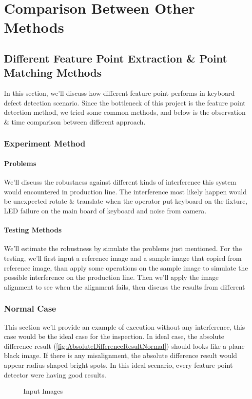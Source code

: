 \chapter{Comparison Between Other Methods}
\label{c:comparision}

\section{Different Feature Point Extraction \& Point Matching Methods}
	In this section, we'll discuss how different feature point performs in keyboard defect detection scenario.
	Since the bottleneck of this project is the feature point detection method, we tried some common methods, and below is the observation \& time comparison between different approach.
	\subsection{Experiment Method}
		\subsubsection{Problems}
			We'll discuss the robustness against different kinds of interference this system would encountered in production line.
			The interference most likely happen would be 
			unexpected rotate \& translate when the operator put keyboard on the fixture, 
			LED failure on the main board of keyboard and noise from camera.
		\subsubsection{Testing Methods}
			We'll estimate the robustness by simulate the problems just mentioned. 
			For the testing, we'll first input a reference image and a sample image that copied from reference image, 
			than apply some operations on the sample image to simulate the possible interference on the production line.
			Then we'll apply the image alignment to see when the alignment fails, then discuss the results from different \\


	\subsection{Normal Case}
		This section we'll provide an example of execution without any interference, this case would be the ideal case for the inspection.
		In ideal case, the absolute difference result (\ref{fig:AbsoluteDifferenceResultNormal}) should looks like a plane black image. If there is any misalignment, the absolute difference result would appear radius shaped bright spots.
		In this ideal scenario, every feature point detector were having good results.
		\begin{figure}[H]
			\caption{Input Images}
			\label{fig:RawImages}
		\end{figure}

